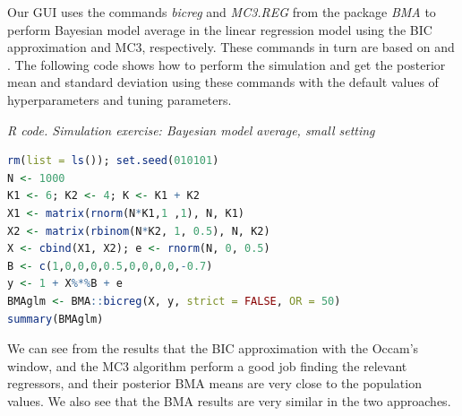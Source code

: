 Our GUI uses the commands \textit{bicreg} and \textit{MC3.REG} from the package \textit{BMA} to perform Bayesian model average in the linear regression model using the BIC approximation and MC3, respectively. These commands in turn are based on \cite{Raftery1995} and \cite{Raftery1997}. The following code shows how to perform the simulation and get the posterior mean and standard deviation using these commands with the default values of hyperparameters and tuning parameters.

\begin{tcolorbox}[enhanced,width=4.67in,center upper,
	fontupper=\large\bfseries,drop shadow southwest,sharp corners]
	\textit{R code. Simulation exercise: Bayesian model average, small setting}
	\begin{VF}
		\begin{lstlisting}[language=R]
rm(list = ls()); set.seed(010101)
N <- 1000
K1 <- 6; K2 <- 4; K <- K1 + K2
X1 <- matrix(rnorm(N*K1,1 ,1), N, K1)
X2 <- matrix(rbinom(N*K2, 1, 0.5), N, K2)
X <- cbind(X1, X2); e <- rnorm(N, 0, 0.5)
B <- c(1,0,0,0,0.5,0,0,0,0,-0.7)
y <- 1 + X%*%B + e
BMAglm <- BMA::bicreg(X, y, strict = FALSE, OR = 50) 
summary(BMAglm)
\end{lstlisting}
	\end{VF}
\end{tcolorbox} 

We can see from the results that the BIC approximation with the Occam's window, and the MC3 algorithm perform a good job finding the relevant regressors, and their posterior BMA means are very close to the population values. We also see that the BMA results are very similar in the two approaches.

